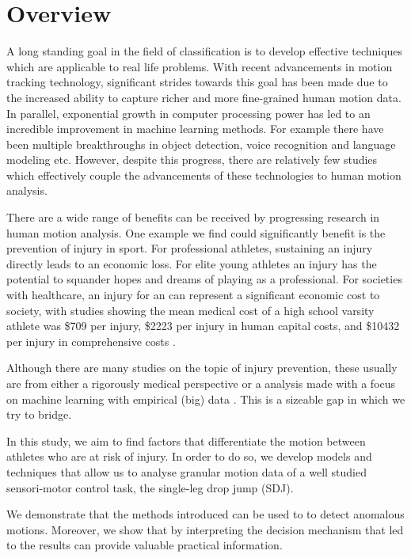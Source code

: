 \section{Overview}
A long standing goal in the field of classification is to develop effective techniques which are applicable to real life problems. With recent advancements in motion tracking technology, significant strides towards this goal has been made due to the increased ability to capture richer and more fine-grained human motion data. In parallel, exponential growth in computer processing power has led to an incredible improvement in machine learning methods. For example there have been multiple breakthroughs in object detection, voice recognition and language modeling etc. However, despite this progress, there are relatively few studies which effectively couple the advancements of these technologies to human motion analysis. 

There are a wide range of benefits can be received by progressing research in human motion analysis. One example we find could significantly benefit is the prevention of injury in sport. For professional athletes, sustaining an injury directly leads to an economic loss. For elite young athletes an injury has the potential to squander hopes and dreams of playing as a professional. For societies with healthcare, an injury for an can represent a significant economic cost to society, with studies showing the mean medical cost of a high school varsity athlete was \$709 per injury, \$2223 per injury in human capital costs, and \$10432 per injury in comprehensive costs \cite{knowles2007cost}.

Although there are many studies on the topic of injury prevention, these usually are from either a rigorously medical perspective \cite{myer2004rationale} or a analysis made with a focus on machine learning with empirical (big) data \cite{alderson2015markerless}. This is a sizeable gap in which we try to bridge. 

In this study, we aim to find factors that differentiate the motion between athletes who are at risk of injury. In order to do so, we develop models and techniques that allow us to analyse granular motion data of a well studied sensori-motor control task, the single-leg drop jump (SDJ). 

We demonstrate that the methods introduced can be used to to detect anomalous motions. Moreover, we show that by interpreting the decision mechanism that led to the results can provide valuable practical information.

